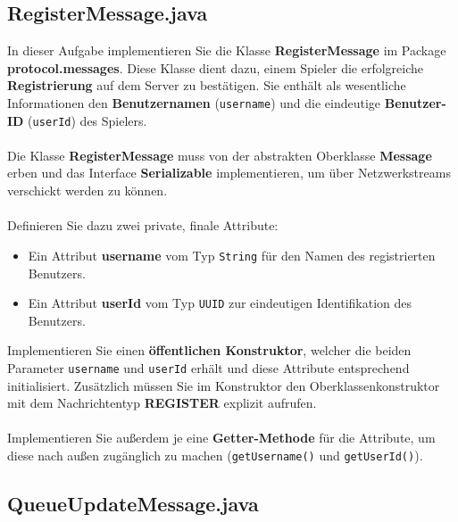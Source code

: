 \documentclass[12pt]{article}
\begin{document}
\subsection*{RegisterMessage.java}

In dieser Aufgabe implementieren Sie die Klasse \textbf{RegisterMessage} im Package \textbf{protocol.messages}. Diese Klasse dient dazu, einem Spieler die erfolgreiche \textbf{Registrierung} auf dem Server zu bestätigen. Sie enthält als wesentliche Informationen den \textbf{Benutzernamen} (\texttt{username}) und die eindeutige \textbf{Benutzer-ID} (\texttt{userId}) des Spielers.
\\ \\
Die Klasse \textbf{RegisterMessage} muss von der abstrakten Oberklasse \textbf{Message} erben und das Interface \textbf{Serializable} implementieren, um über Netzwerkstreams verschickt werden zu können.
\\ \\
Definieren Sie dazu zwei private, finale Attribute:
\begin{itemize}
    \item Ein Attribut \textbf{username} vom Typ \texttt{String} für den Namen des registrierten Benutzers.
    \item Ein Attribut \textbf{userId} vom Typ \texttt{UUID} zur eindeutigen Identifikation des Benutzers.
\end{itemize}

Implementieren Sie einen \textbf{öffentlichen Konstruktor}, welcher die beiden Parameter \texttt{username} und \texttt{userId} erhält und diese Attribute entsprechend initialisiert. Zusätzlich müssen Sie im Konstruktor den Oberklassenkonstruktor mit dem Nachrichtentyp \textbf{REGISTER} explizit aufrufen.
\\ \\
Implementieren Sie außerdem je eine \textbf{Getter-Methode} für die Attribute, um diese nach außen zugänglich zu machen (\texttt{getUsername()} und \texttt{getUserId()}).

\subsection*{QueueUpdateMessage.java}
\end{document}
